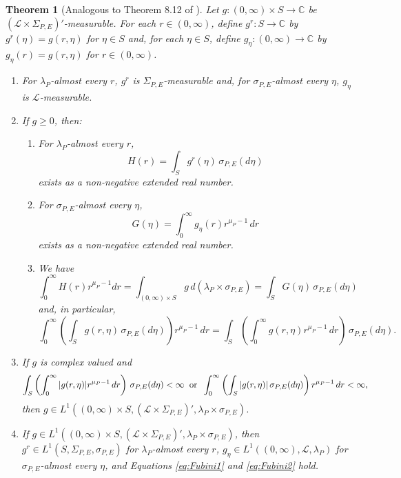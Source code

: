 \documentclass[11pt, letter]{book}
\newtheorem{theorem}{Theorem}[section]
\begin{document}
\begin{framed}


\begin{theorem}[Analogous to Theorem 8.12 of \cite{rudin_real_1987}]\label{thm:Fubini}
Let $g:(0,\infty)\times S\to\mathbb{C}$ be $(\mathcal{L}\times\Sigma_{P,E})'$-measurable. For each $r\in (0,\infty)$, define $g^r:S\to\mathbb{C}$ by $g^r(\eta)=g(r,\eta)$ for $\eta\in S$ and, for each $\eta\in S$, define $g_\eta:(0,\infty)\to\mathbb{C}$ by $g_\eta(r)=g(r,\eta)$ for $r\in (0,\infty)$. 
\begin{enumerate}
\item For $\lambda_P$-almost every $r$, $g^r$ is $\Sigma_{P,E}$-measurable and, for $\sigma_{P,E}$-almost every $\eta$, $g_\eta$ is $\mathcal{L}$-measurable.
\item\label{item:Fubini1} If $g\geq 0$, then:
\begin{enumerate}
\item For $\lambda_P$-almost every $r$, 
\begin{equation*}
H(r)=\int_S g^r(\eta)\,\sigma_{P,E}(d\eta)
\end{equation*}
exists as a non-negative extended real number. 
\item For $\sigma_{P,E}$-almost every $\eta$,
\begin{equation*}
G(\eta)=\int_0^\infty g_\eta(r)r^{\mu_P-1}\,dr
\end{equation*}
exists as a non-negative extended real number. 
\item We have
\begin{equation}\label{eq:Fubini1}
\int_0^\infty H(r)r^{\mu_P-1}dr=\int_{(0,\infty)\times S}g\,d(\lambda_P\times\sigma_{P,E})=\int_S G(\eta)\,\sigma_{P,E}(d\eta)
\end{equation}
and, in particular,
\begin{equation}\label{eq:Fubini2}
\int_0^\infty\left(\int_S g(r,\eta)\,\sigma_{P,E}(d\eta)\right)r^{\mu_P-1}\,dr=\int_S\left(\int_0^\infty g(r,\eta)r^{\mu_P-1}\,dr\right)\,\sigma_{P,E}(d\eta).
\end{equation}
\end{enumerate}
\item\label{item:Fubini2} If $g$ is complex valued and
\begin{equation*}
\int_S\left(\int_0^\infty |g(r,\eta)|r^{\mu_P-1}\,dr\right)\,\sigma_{P,E}(d\eta)<\infty\hspace{.2cm}\mbox{or}\hspace{.2cm}\int_0^\infty\left(\int_S|g(r,\eta)|\,\sigma_{P,E}(d\eta)\right)r^{\mu_P-1}\,dr<\infty,
\end{equation*}
then $g\in L^1((0,\infty)\times S,(\mathcal{L}\times\Sigma_{P,E})',\lambda_P\times\sigma_{P,E})$.
\item If $g\in L^1((0,\infty)\times S,(\mathcal{L}\times\Sigma_{P,E})',\lambda_P\times\sigma_{P,E})$, then $g^r\in L^1(S,\Sigma_{P,E},\sigma_{P,E})$ for $\lambda_P$-almost every $r$, $g_\eta\in L^1((0,\infty),\mathcal{L},\lambda_P)$ for $\sigma_{P,E}$-almost every $\eta$, and Equations \eqref{eq:Fubini1} and \eqref{eq:Fubini2} hold.
\end{enumerate}
\end{theorem}
\end{framed}
\end{document}
